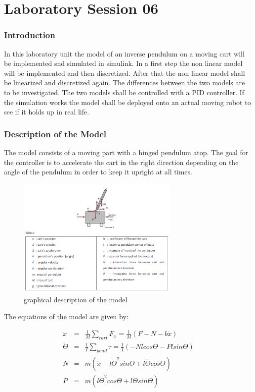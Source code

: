 \part{Laboratory Session 06}

\section*{Introduction}
In this laboratory unit the model of an inverse pendulum on a moving cart will be implemented snd simulated in simulink. In a first step the non linear model will be implemented and then discretized. After that the non linear model shall be linearized and discretized again. The differences between the two models are to be investigated. The two models shall be controlled with a PID controller. If the simulation works the model shall be deployed onto an actual moving robot to see if it holds up in real life.
 
\newpage
\section{Description of the Model}
The model consists of a moving part with a hinged pendulum atop. The goal for the controller is to accelerate the cart in the right direction depending on the angle of the pendulum in order to keep it upright at all times. 
\begin{figure}[H]
		\centering
		\includegraphics[width=0.7\textwidth]{figures/cart.png}
		\caption{graphical description of the model}
		\label{fig:scheme}
\end{figure}

The equations of the model are given by: 

	\begin{eqnarray}
		\ddot{x} &=& \frac{1}{M} \sum_{cart} F_x = \frac{1}{M} \left( F - N - b\dot{x}\right)  \\
		\ddot{\Theta} &=& \frac{1}{I} \sum_{pend} \tau = \frac{1}{I} \left( -Nlcos\Theta - Plsin\Theta \right)  \\
		N &=& m\left( \ddot{x} - l\dot{\Theta}^2 sin\Theta + l\ddot{\Theta}cos\Theta\right)  \\
		P &=& m\left( l\ddot{\Theta}^2cos\Theta + l\ddot{\Theta}sin \Theta\right) 
	\end{eqnarray}
\newpage	
